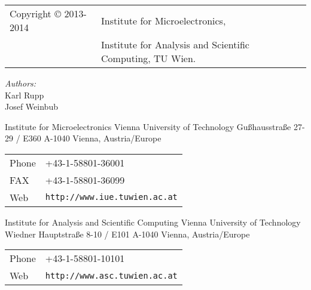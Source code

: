 
\clearpage

\begin{tabular}{ll}
Copyright {\copyright} 2013-2014 & Institute for Microelectronics, \\
                            & Institute for Analysis and Scientific Computing, TU Wien.
\end{tabular}

\vspace{2.5cm}

\textit{Authors:}\\

Karl Rupp\\
Josef Weinbub \\

\vspace{1cm}


\vspace{4.0cm}

Institute for Microelectronics\newline
Vienna University of Technology\newline
Gu\ss hausstra\ss e 27-29 / E360\newline
A-1040 Vienna, Austria/Europe\newline

\begin{tabular}{ll}
Phone  & +43-1-58801-36001\\
FAX    & +43-1-58801-36099\\
Web    & \texttt{http://www.iue.tuwien.ac.at}
\end{tabular}

\vspace{1.5cm}

Institute for Analysis and Scientific Computing\newline
Vienna University of Technology\newline
Wiedner Hauptstra\ss e 8-10 / E101\newline
A-1040 Vienna, Austria/Europe\newline

\begin{tabular}{ll}
Phone  & +43-1-58801-10101\\
Web    & \texttt{http://www.asc.tuwien.ac.at}
\end{tabular}




